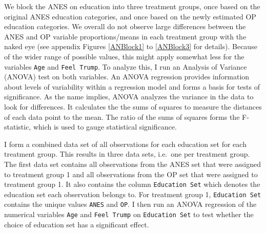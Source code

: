 \documentclass[12pt,econ]{sources/authesis}
\begin{document}
We block the ANES on education into three treatment groups, once based on the original ANES education categories, and once based on the newly estimated OP education categories. We overall do not observe large differences between the ANES and OP variable proportions/means in each treatment group with the naked eye (see appendix Figures \ref{ANBlock1} to \ref{ANBlock3} for details). Because of the wider range of possible values, this might apply somewhat less for the variables \texttt{Age} and \texttt{Feel\ Trump}. To analyze this, I run an Analysis of Variance (ANOVA) test on both variables. An ANOVA regression provides information about levels of variability within a regression model and forms a basis for tests of significance. As the name implies, ANOVA analyzes the variance in the data to look for differences. It calculates the the sums of squares to measure the distances of each data point to the mean. The ratio of the sums of squares forms the F-statistic, which is used to gauge statistical significance.

I form a combined data set of all observations for each education set for each treatment group. This results in three data sets, i.e.~one per treatment group. The first data set contains all observations from the ANES set that were assigned to treatment group 1 and all observations from the OP set that were assigned to treatment group 1. It also contains the column \texttt{Education\ Set} which denotes the education set each observation belongs to. For treatment group 1, \texttt{Education\ Set} contains the unique values \texttt{ANES} and \texttt{OP}. I then run an ANOVA regression of the numerical variables \texttt{Age} and \texttt{Feel\ Trump} on \texttt{Education\ Set} to test whether the choice of education set has a significant effect.
\end{document}
